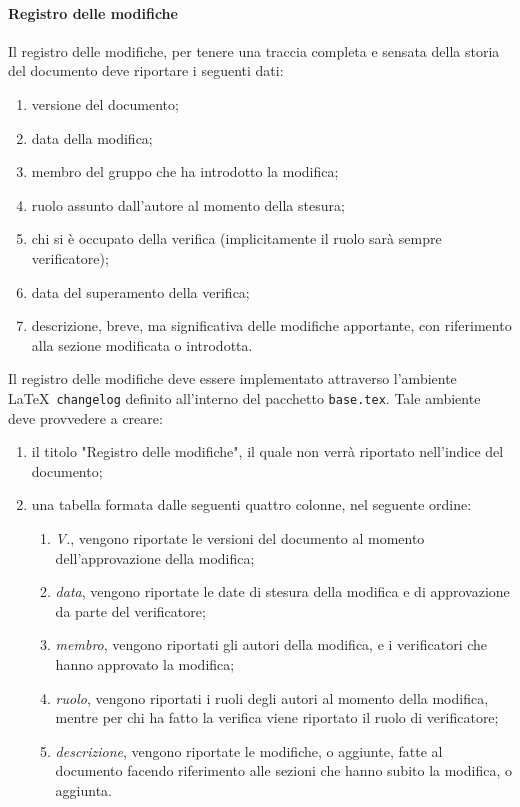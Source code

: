         \paragraph{Registro delle modifiche} \label{sec:doc_changelog}%
            Il registro delle modifiche, per tenere una traccia completa e sensata della storia del documento deve riportare i seguenti dati:
            \begin{multicols}{2}
            	\begin{enumerate}
            		\item versione del documento;
            		\item data della modifica;
            		\item membro del gruppo che ha introdotto la modifica;
            		\item ruolo assunto dall'autore al momento della stesura;
            		\item chi si è occupato della verifica (implicitamente il ruolo sarà sempre verificatore);
            		\item data del superamento della verifica;
            		\item descrizione, breve, ma significativa delle modifiche apportante, con riferimento alla sezione modificata o introdotta.
            	\end{enumerate}
            \end{multicols}
            \noindent
            Il registro delle modifiche deve essere implementato attraverso l'ambiente \LaTeX\ \verb|changelog| definito all'interno del pacchetto \verb|base.tex|. Tale ambiente deve provvedere a creare:
            \begin{enumerate}
                \item il titolo "Registro delle modifiche", il quale non verrà riportato nell'indice del documento;
                \item una tabella formata dalle seguenti quattro colonne, nel seguente ordine:
                \begin{enumerate}
                    \item \emph{V.}, vengono riportate le versioni del documento al momento dell'approvazione della modifica;
                    \item \emph{data}, vengono riportate le date di stesura della modifica e di approvazione da parte del verificatore;
                    \item \emph{membro}, vengono riportati gli autori della modifica, e i verificatori che hanno approvato la modifica;
                    \item \emph{ruolo}, vengono riportati i ruoli degli autori al momento della modifica, mentre per chi ha fatto la verifica viene riportato il ruolo di verificatore;
                    \item \emph{descrizione}, vengono riportate le modifiche, o aggiunte, fatte al documento facendo riferimento alle sezioni che hanno subito la modifica, o aggiunta. 
                \end{enumerate}
            \end{enumerate}
